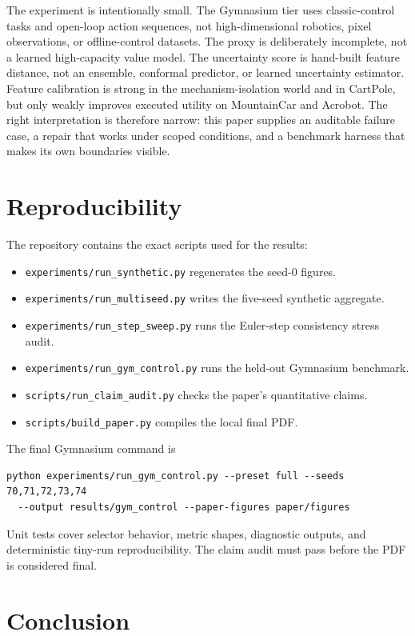 \documentclass[10pt]{article}
\begin{document}
The experiment is intentionally small. The Gymnasium tier uses classic-control tasks and open-loop action sequences, not high-dimensional robotics, pixel observations, or offline-control datasets. The proxy is deliberately incomplete, not a learned high-capacity value model. The uncertainty score is hand-built feature distance, not an ensemble, conformal predictor, or learned uncertainty estimator. Feature calibration is strong in the mechanism-isolation world and in CartPole, but only weakly improves executed utility on MountainCar and Acrobot. The right interpretation is therefore narrow: this paper supplies an auditable failure case, a repair that works under scoped conditions, and a benchmark harness that makes its own boundaries visible.

\section{Reproducibility}

The repository contains the exact scripts used for the results:
\begin{itemize}
\item \texttt{experiments/run\_synthetic.py} regenerates the seed-0 figures.
\item \texttt{experiments/run\_multiseed.py} writes the five-seed synthetic aggregate.
\item \texttt{experiments/run\_step\_sweep.py} runs the Euler-step consistency stress audit.
\item \texttt{experiments/run\_gym\_control.py} runs the held-out Gymnasium benchmark.
\item \texttt{scripts/run\_claim\_audit.py} checks the paper's quantitative claims.
\item \texttt{scripts/build\_paper.py} compiles the local final PDF.
\end{itemize}
The final Gymnasium command is
\begin{verbatim}
python experiments/run_gym_control.py --preset full --seeds 70,71,72,73,74
  --output results/gym_control --paper-figures paper/figures
\end{verbatim}
Unit tests cover selector behavior, metric shapes, diagnostic outputs, and deterministic tiny-run reproducibility. The claim audit must pass before the PDF is considered final.

\section{Conclusion}
\end{document}
